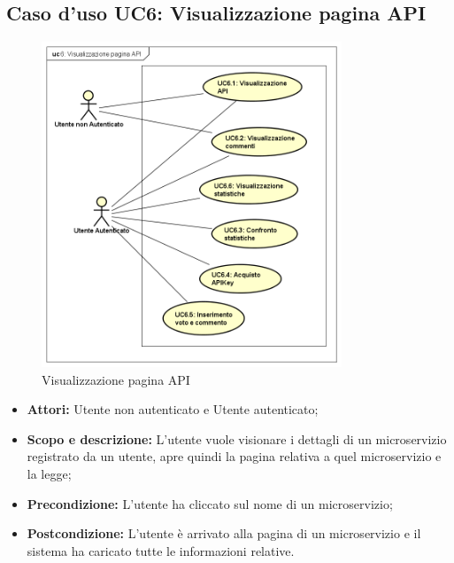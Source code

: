 \documentclass[12pt,a4paper,titlepage]{article}
\begin{document}
\subsection{Caso d'uso UC6: Visualizzazione pagina API}
\begin{figure}[H]
	\centering
	\includegraphics[width=0.8\textwidth]{UseCase/VisualizzazionePaginaAPI}
	\caption{Visualizzazione pagina API}
\end{figure}
\begin{itemize}
	\item \textbf{Attori: }Utente non autenticato e Utente autenticato;
	\item \textbf{Scopo e descrizione: }L'utente vuole visionare i dettagli di un microservizio registrato da un utente, apre quindi la pagina relativa a quel microservizio e la legge;
	\item \textbf{Precondizione: }L'utente ha cliccato sul nome di un microservizio;
	\item \textbf{Postcondizione: }L'utente è arrivato alla pagina di un microservizio e il sistema ha caricato tutte le informazioni relative.
\end{itemize}
\end{document}
